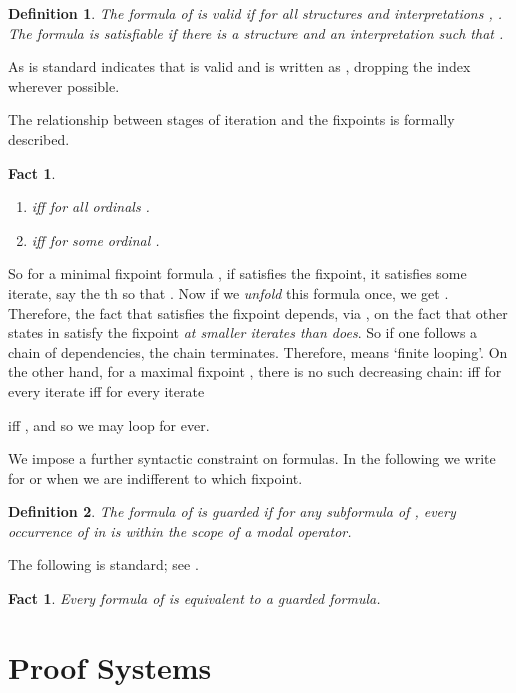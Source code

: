 \documentclass[copyright,creativecommons]{eptcs}
\renewcommand{\ni}{\noindent}
\newtheorem{defin}{Definition}
\newtheorem{fact}[prop]{Fact}
\def\w{\emph}
\begin{document}
 

\begin{defin} The formula  of  is \w{valid} if for all
structures  and interpretations , .
The formula  is \w{satisfiable} if there is a structure
 and an interpretation  such that .
\end{defin}

\ni
As is standard  indicates that  is valid and 
 is written as  , dropping the
index  wherever possible. 

The relationship between stages of iteration and
the fixpoints is formally described.

\begin{fact}
\label{fact1}   
\begin{enumerate}
\item  iff   for all 
ordinals .
\item  iff  for some
ordinal .  
\end{enumerate}
\end{fact}
So for a minimal fixpoint formula 
, if  satisfies the 
fixpoint, it satisfies some iterate, say the
th so that
. 
Now if we \w{unfold} this formula once, we get
. Therefore, 
the fact that  satisfies the fixpoint
depends, via , on the fact that other states in 
satisfy the fixpoint
\emph{at smaller iterates than  does}. So if one follows a chain
of dependencies, the chain terminates. 
Therefore,  means
`finite looping'.
On the other hand, for a maximal fixpoint , there is no such
decreasing chain:  iff 
 for every iterate
 iff  for every iterate

iff , and so we may loop
for ever. 

We impose a further syntactic constraint on formulas. In the following we write
 for  or  when we are indifferent to 
which  fixpoint.  


\begin{defin}
The formula  of  is \w{guarded} if for any subformula
 of , every occurrence of  in  is within 
the scope of a modal operator. 
\end{defin}

\ni
The following is standard; see \cite{Koz83,NiWa96,Wal00}.

\begin{fact} 
\label{guarded} Every formula of   is equivalent to a guarded
formula.
\end{fact}


\section{Proof Systems}
\label{secproof}
\end{document}
